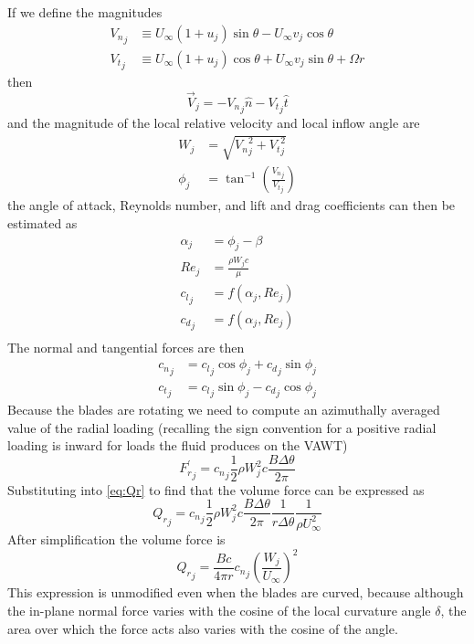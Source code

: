 \documentclass{article}
\begin{document}
If we define the magnitudes
\begin{align*}
{V_n}_j &\equiv U_\infty(1+u_j) \sin\theta - U_\infty v_j \cos\theta\\
{V_t}_j &\equiv U_\infty(1+u_j) \cos\theta + U_\infty v_j \sin\theta +\Omega r
\end{align*}
then
\[ \vec{V}_j =  -{V_n}_j\hat{n} -{V_t}_j\hat{t} \]
and the magnitude of the local relative velocity and local inflow angle are
\begin{align*}
W_j &= \sqrt{{V_n}_j^2 + {V_t}_j^2}\\
\phi_j &= \tan^{-1}\left(\frac{{V_n}_j}{{V_t}_j}\right)
\end{align*}
the angle of attack, Reynolds number, and lift and drag coefficients can then be estimated as
\begin{equation}
  \begin{aligned}
\alpha_j &= \phi_j - \beta\\
Re_j &= \frac{\rho W_j c}{\mu}\\
{c_l}_j &= f(\alpha_j, Re_j)\\
{c_d}_j &= f(\alpha_j, Re_j)\\
\end{aligned}
\end{equation}
The normal and tangential forces are then
\begin{equation}
\begin{aligned}
{c_n}_j &= {c_l }_j\cos\phi_j + {c_d}_j\sin\phi_j \\
{c_t}_j &= {c_l }_j\sin\phi_j - {c_d}_j\cos\phi_j
\end{aligned}
\end{equation}
Because the blades are rotating we need to compute an azimuthally averaged value of the radial loading (recalling the sign convention for a positive radial loading is inward for loads the fluid produces on the VAWT)
\begin{equation}
  {F_r^\prime}_j = {c_n}_j \frac{1}{2}\rho W_j^2 c \frac{B \Delta\theta}{2\pi}
\end{equation}
Substituting into \eqref{eq:Qr} to find that the volume force can be expressed as
\begin{equation}
{Q_r}_j = {c_n}_j \frac{1}{2}\rho W_j^2 c \frac{B \Delta\theta}{2\pi} \frac{1}{r \Delta\theta} \frac{1}{\rho U_\infty^2}
\end{equation}
After simplification the volume force is
\begin{equation}
{Q_r}_j = \frac{Bc}{4\pi r}{c_n}_j \left(\frac{W_j}{U_\infty}\right)^2
\end{equation}
This expression is unmodified even when the blades are curved, because although the in-plane normal force varies with the cosine of the local curvature angle $\delta$, the area over which the force acts also varies with the cosine of the angle.
\end{document}
